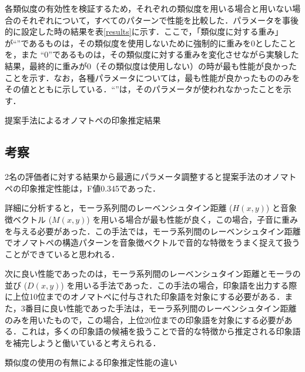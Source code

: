 \documentclass[japanese]{jnlp_1.4}
\newcommand{\addtext}[1]{}
\newcommand{\inzero}{}
\newcommand{\indc}{}
\begin{document}
各類似度の有効性を検証するため，それぞれの類似度を用いる場合と用いない場合のそれぞれについて，すべてのパターンで性能を比較した．\addtext{各評価者が付与した印象語を正解とし，それぞれに対するF値を平均した値が最も高くなるように}パラメータを事後的に設定した時の結果を表\ref{results}に示す．ここで，「類似度に対する重み」が``\inzero''であるものは，その類似度を使用しないために強制的に重みを0としたことを，また ``0''であるものは，その類似度に対する重みを変化させながら実験した結果，最終的に重みが0（その類似度は使用しない）の時が最も性能が良かったことを示す．なお，各種パラメータについては，最も性能が良かったもののみをその値とともに示している．``\indc''は，そのパラメータが使われなかったことを示す．


\begin{table}[t]
\caption{提案手法によるオノマトペの印象推定結果}
\label{results}

\end{table}



\subsection{考察}

2名の評価者に対する結果から最適にパラメータ調整すると提案手法のオノマトペの印象推定性能は，F値0.345であった．\addtext{この数値は，{\ref{re}}節で述べた本論文の参考値である人間同士の一致率にあたるF値0.427の8割程度にあたり，有効な手法であるといえる．}

詳細に分析すると，モーラ系列間のレーベンシュタイン距離 ($H(x,y)$) と音象徴ベクトル ($M(x,y)$) を用いる場合が最も性能が良く，この場合，子音に重みを与える必要があった．この手法では，モーラ系列間のレーベンシュタイン距離でオノマトペの構造パターンを音象徴ベクトルで音的な特徴をうまく捉えて扱うことができていると思われる．

次に良い性能であったのは，モーラ系列間のレーベンシュタイン距離とモーラの並び ($D(x,y)$) を用いる手法であった．この手法の場合，印象語を出力する際に上位10位までのオノマトペに付与された印象語を対象にする必要がある．また，3番目に良い性能であった手法は，モーラ系列間のレーベンシュタイン距離のみを用いたもので，この場合，上位20位までの印象語を対象にする必要がある．これは，多くの印象語の候補を扱うことで音的な特徴から推定される印象語を補完しようと働いていると考えられる．

\begin{table}[b]
\caption{類似度の使用の有無による印象推定性能の違い}
\label{karnaugh}

\end{table}
\end{document}
